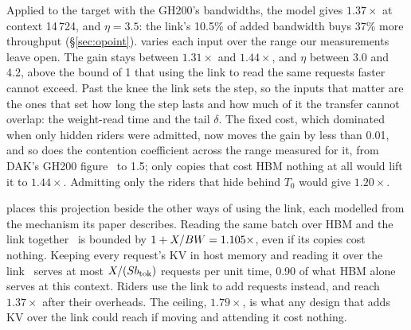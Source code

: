 Applied to the target with the GH200's bandwidths, the model gives
$1.37\times$ at context 14\,724, and $\eta = 3.5$: the link's 10.5\% of added
bandwidth buys 37\% more throughput (\S\ref{sec:opoint}).
 varies each input over the range our measurements leave open.
The gain stays between $1.31\times$ and $1.44\times$, and $\eta$ between 3.0
and 4.2, above the bound of 1 that using the link to read the same requests
faster cannot exceed. Past the knee the link sets the step, so the inputs that
matter are the ones that set how long the step lasts and how much of it the
transfer cannot overlap: the weight-read time and the tail $\delta$. The fixed
cost, which dominated when only hidden riders were admitted, now moves the gain
by less than 0.01, and so does the contention coefficient across the range
measured for it, from DAK's GH200 figure~\cite{dak} to 1.5; only copies that
cost HBM nothing at all would lift it to $1.44\times$. Admitting only the riders
that hide behind $T_0$ would give $1.20\times$.



 places this projection beside the other ways of using the
link, each modelled from the mechanism its paper describes. Reading the same
batch over HBM and the link together~\cite{dak} is bounded by
$1+X/BW = 1.105\times$, even if its copies cost nothing. Keeping every
request's KV in host memory and reading it over the link~\cite{directkv}
serves at most $X/(Sb_{\mathrm{tok}})$ requests per unit time, 0.90 of what HBM alone
serves at this context. Riders use the link to add requests instead, and
reach $1.37\times$ after their overheads. The ceiling, $1.79\times$, is
what any design that adds KV over the link could reach if moving and
attending it cost nothing.

